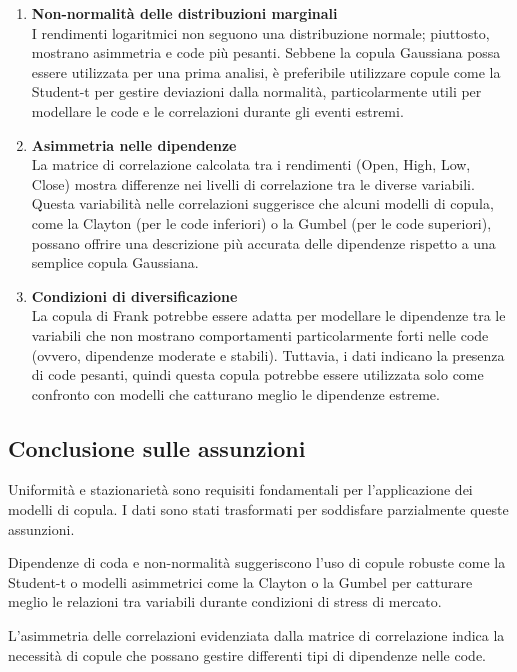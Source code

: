 \documentclass[%
	corpo=11pt,
    twoside,
    stile=classica,
    oldstyle,
    tipotesi=custom,
    greek,
    evenboxes,
]{toptesi}
\begin{document}
\begin{enumerate}
	\item \textbf{Non-normalità delle distribuzioni marginali} \\
	I rendimenti logaritmici non seguono una distribuzione normale; piuttosto, mostrano asimmetria e code più pesanti. Sebbene la copula Gaussiana possa essere utilizzata per una prima analisi, è preferibile utilizzare copule come la Student-t per gestire deviazioni dalla normalità, particolarmente utili per modellare le code e le correlazioni durante gli eventi estremi.
	
	\item \textbf{Asimmetria nelle dipendenze} \\
	La matrice di correlazione calcolata tra i rendimenti (Open, High, Low, Close) mostra differenze nei livelli di correlazione tra le diverse variabili. Questa variabilità nelle correlazioni suggerisce che alcuni modelli di copula, come la Clayton (per le code inferiori) o la Gumbel (per le code superiori), possano offrire una descrizione più accurata delle dipendenze rispetto a una semplice copula Gaussiana.
	
	\item \textbf{Condizioni di diversificazione} \\
	La copula di Frank potrebbe essere adatta per modellare le dipendenze tra le variabili che non mostrano comportamenti particolarmente forti nelle code (ovvero, dipendenze moderate e stabili). Tuttavia, i dati indicano la presenza di code pesanti, quindi questa copula potrebbe essere utilizzata solo come confronto con modelli che catturano meglio le dipendenze estreme.
\end{enumerate}

\subsection{Conclusione sulle assunzioni}

Uniformità e stazionarietà sono requisiti fondamentali per l’applicazione dei modelli di copula. I dati sono stati trasformati per soddisfare parzialmente queste assunzioni.

Dipendenze di coda e non-normalità suggeriscono l’uso di copule robuste come la Student-t o modelli asimmetrici come la Clayton o la Gumbel per catturare meglio le relazioni tra variabili durante condizioni di stress di mercato.

L'asimmetria delle correlazioni evidenziata dalla matrice di correlazione indica la necessità di copule che possano gestire differenti tipi di dipendenze nelle code.
\end{document}
